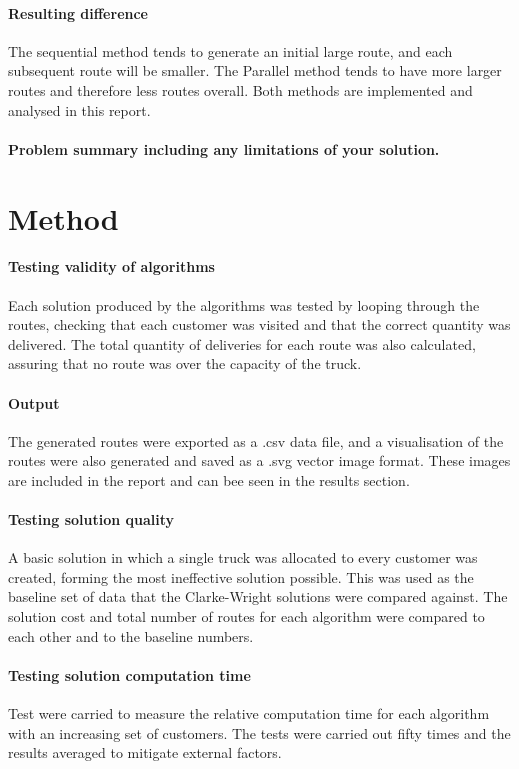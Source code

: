 \documentclass[conference]{acmsiggraph}
\begin{document}
\paragraph{Resulting difference}
The sequential method tends to generate an initial large route, and each subsequent route will be smaller. The Parallel method tends to have more larger routes and therefore less routes overall. Both methods are implemented and analysed in this report.

\paragraph{Problem summary including any limitations of your solution.}


\section{Method}
\paragraph{Testing validity of algorithms}
Each solution produced by the algorithms was tested by looping through the routes, checking that each customer was visited and that the correct quantity was delivered. The total quantity of deliveries for each route was also calculated, assuring that no route was over the capacity of the truck.

\paragraph{Output}
The generated routes were exported as a .csv data file, and a visualisation of the routes were also generated and saved as a .svg vector image format. These images are included in the report and can bee seen in the results section.

\paragraph{Testing solution quality}
A basic solution in which a single truck was allocated to every customer was created, forming the most ineffective solution possible. This was used as the baseline set of data that the Clarke-Wright solutions were compared against. The solution cost and total number of routes for each algorithm were compared to each other and to the baseline numbers.

\paragraph{Testing solution computation time}
Test were carried to measure the relative computation time for each algorithm with an increasing set of customers. The tests were carried out fifty times and the results averaged to mitigate external factors.
\end{document}
